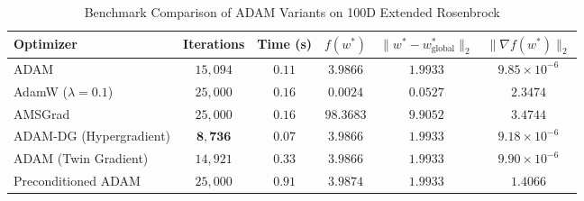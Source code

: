 \documentclass[11pt,a4paper]{article}
\newcommand{\added}[1]{#1}
\begin{document}
\added{\begin{table}[H]
\centering
\small
\setlength{\tabcolsep}{5pt}
\caption{Benchmark Comparison of ADAM Variants on 100D Extended Rosenbrock}\label{tab:100d_variants_benchmark}
\begin{tabular}{lccccc}
\toprule
\textbf{Optimizer} & \textbf{Iterations} & \textbf{Time (s)} & $f(w^*)$ & $\|w^* - w^*_{\text{global}}\|_2$ & $\|\nabla f(w^*)\|_2$ \\
\midrule
ADAM & $15{,}094$ & $0.11$ & $3.9866$ & $1.9933$ & $9.85 \times 10^{-6}$ \\
AdamW ($\lambda = 0.1$) & $25{,}000$ & $0.16$ & $\mathbf{0.0024}$ & $\mathbf{0.0527}$ & $2.3474$ \\
AMSGrad & $25{,}000$ & $0.16$ & $98.3683$ & $9.9052$ & $3.4744$ \\
ADAM-DG (Hypergradient) & $\mathbf{8{,}736}$ & $\mathbf{0.07}$ & $3.9866$ & $1.9933$ & $9.18 \times 10^{-6}$ \\
ADAM (Twin Gradient) & $14{,}921$ & $0.33$ & $3.9866$ & $1.9933$ & $9.90 \times 10^{-6}$ \\
Preconditioned ADAM & $25{,}000$ & $0.91$ & $3.9874$ & $1.9933$ & $1.4066$ \\
\bottomrule
\end{tabular}
\end{table}}
\end{document}
